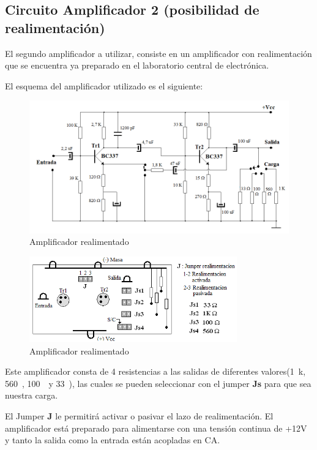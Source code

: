 \subsection{Circuito Amplificador 2 (posibilidad de realimentación)}
\label{sec:Amp2}

El segundo amplificador a utilizar, consiste en un amplificador con realimentación que se encuentra ya preparado en el laboratorio central de electrónica.

El esquema del amplificador utilizado es el siguiente:

\begin{figure}[H]
    \centering
    \includegraphics[width=\textwidth]{Imagenes/Esq_amp_tp3.png}
    \caption{Amplificador realimentado}
    \label{fig:esq_amp_tp3}
\end{figure}

\begin{figure}[H]
    \centering
    \includegraphics[width=0.8\textwidth]{Imagenes/Esq2_amp_tp3.png}
    \caption{Amplificador realimentado}
    \label{fig:esq2_amp_tp3}
\end{figure}


Este amplificador consta de 4 resistencias a las salidas de diferentes valores(1~k\ohm, 560~\ohm, 100~\ohm~y 33~\ohm), las cuales se pueden seleccionar con el jumper \textbf{Js} para que sea nuestra carga.

El Jumper \textbf{J} le permitirá activar o pasivar el lazo de realimentación. El amplificador está preparado para alimentarse con una tensión continua de +12V y tanto la salida como la entrada están acopladas en CA.


